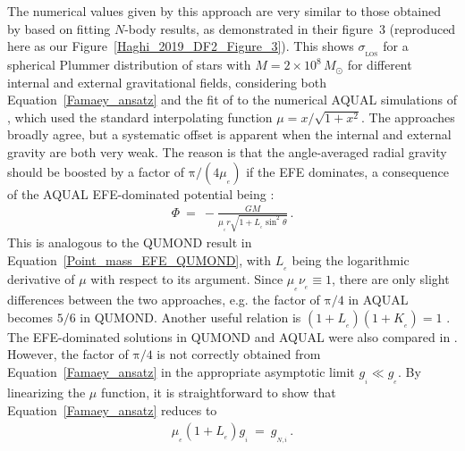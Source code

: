 \documentclass[fleqn,usenatbib,useAMS,onecolumn]{mnras} %
\begin{document}
The numerical values given by this approach are very similar to those obtained by \citet{Haghi_2019_DF2} based on fitting $N$-body results, as demonstrated in their figure~3 (reproduced here as our Figure~\ref{Haghi_2019_DF2_Figure_3}). This shows $\sigma_{_\text{LOS}}$ for a spherical Plummer distribution of stars with $M = 2 \times 10^8 \, M_\odot$ for different internal and external gravitational fields, considering both Equation~\ref{Famaey_ansatz} and the fit of \citet{Haghi_2019_DF2} to the numerical AQUAL simulations of \citet{Haghi_2009}, which used the standard interpolating function $\mu = x/\sqrt{1 + x^2}$. The approaches broadly agree, but a systematic offset is apparent when the internal and external gravity are both very weak. The reason is that the angle-averaged radial gravity should be boosted by a factor of $\mathrm{\pi}/\left( 4 \mu_{_e} \right)$ if the EFE dominates, a consequence of the AQUAL EFE-dominated potential being \citep{Milgrom_1986}:
\begin{eqnarray}
	\label{Point_mass_EFE_AQUAL}
	\Phi ~=~ -\frac{GM}{\mu_{_e}r\sqrt{1 + L_{_e} \sin^2 \theta}} \, .
\end{eqnarray}
This is analogous to the QUMOND result in Equation~\ref{Point_mass_EFE_QUMOND}, with $L_{_e}$ being the logarithmic derivative of $\mu$ with respect to its argument. Since $\mu_{_e} \nu_{_e} \equiv 1$, there are only slight differences between the two approaches, e.g. the factor of $\mathrm{\pi}/{4}$ in AQUAL becomes $5/6$ in QUMOND. Another useful relation is $\left( 1 + L_{_e} \right) \left( 1 + K_{_e} \right) = 1$ \citep[equation~38 of][]{Banik_2018_Centauri}. The EFE-dominated solutions in QUMOND and AQUAL were also compared in \citet{QUMOND}. However, the factor of $\mathrm{\pi}/4$ is not correctly obtained from Equation~\ref{Famaey_ansatz} in the appropriate asymptotic limit $g_{_i} \ll g_{_e}$. By linearizing the $\mu$ function, it is straightforward to show that Equation~\ref{Famaey_ansatz} reduces to
\begin{eqnarray}
	\mu_{_e} \left( 1 + L_{_e} \right) g_{_i} ~=~ g_{_{N,i}} \, .
\end{eqnarray}
\end{document}
